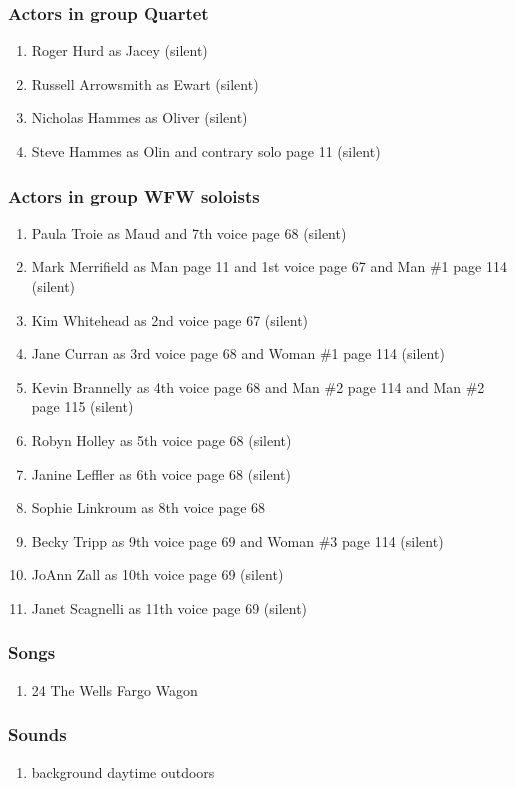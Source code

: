 \subsubsection{Actors in group Quartet}
\begin{enumerate}
\item Roger Hurd as Jacey (silent)
\item Russell Arrowsmith as Ewart (silent)
\item Nicholas Hammes as Oliver (silent)
\item Steve Hammes as Olin and contrary solo page 11 (silent)
\end{enumerate}
\subsubsection{Actors in group WFW soloists}
\begin{enumerate}
\item Paula Troie as Maud and 7th voice page 68 (silent)
\item Mark Merrifield as Man page 11 and 1st voice page 67 and Man \#1 page 114 (silent)
\item Kim Whitehead as 2nd voice page 67 (silent)
\item Jane Curran as 3rd voice page 68 and Woman \#1 page 114 (silent)
\item Kevin Brannelly as 4th voice page 68 and Man \#2 page 114 and Man \#2 page 115 (silent)
\item Robyn Holley as 5th voice page 68 (silent)
\item Janine Leffler as 6th voice page 68 (silent)
\item Sophie Linkroum as 8th voice page 68
\item Becky Tripp as 9th voice page 69 and Woman \#3 page 114 (silent)
\item JoAnn Zall as 10th voice page 69 (silent)
\item Janet Scagnelli as 11th voice page 69 (silent)
\end{enumerate}

\subsubsection{Songs}
\begin{enumerate}
\item 24 The Wells Fargo Wagon
\end{enumerate}\subsubsection{Sounds}
\begin{enumerate}
\item background daytime outdoors
\end{enumerate}
